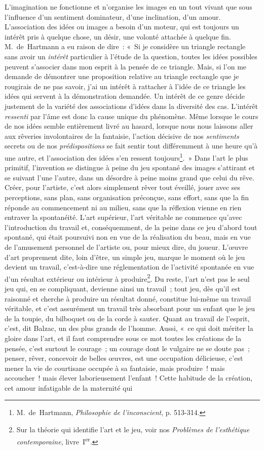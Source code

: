 \documentclass[french,twoside]{book} %
\begin{document}
L’imagination ne fonctionne et n’organise les images en un tout vivant que sous l’influence d’un sentiment dominateur, d’une inclination, d’un amour. L’association des idées ou images a besoin d’un moteur, qui est toujours un intérêt pris à quelque chose, un désir, une volonté attachée à quelque fin. M. de Hartmann a eu raison de dire : « Si je considère un triangle rectangle sans avoir un \emph{intérêt} particulier à l’étude de la question, toutes les idées possibles peuvent s’associer dans mon esprit à la pensée de ce triangle. Mais, si l’on me demande de démontrer une proposition relative au triangle rectangle que je rougirais de ne pas savoir, j’ai un intérêt à rattacher à l’idée de ce triangle les idées qui servent à la démonstration demandée. Un intérêt de ce genre décide justement de la variété des associations d’idées dans la diversité des cas. L’intérêt \emph{ressenti} par l’âme est donc la cause unique du phénomène. Même lorsque le cours de nos idées semble entièrement livré au hasard, lorsque nous nous laissons aller aux rêveries involontaires de la fantaisie, l’action décisive de nos \emph{sentiments} secrets ou de nos \emph{prédispositions} se fait sentir tout différemment à une heure qu’à une autre, et l’association des idées s’en ressent toujours\footnote{ M. de Hartmann, \emph{Philosophie de l’inconscient}, p. 513-314.}. » Dans l’art le plus primitif, l’invention se distingue à peine du jeu spontané des images s’attirant et se suivant l’une l’autre, dans un désordre à peine moins grand que celui du rêve. Créer, pour l’artiste, c’est alors simplement rêver tout éveillé, jouer avec ses perceptions, sans plan, sans organisation préconçue, sans effort, sans que la fin réponde au commencement ni au milieu, sans que la réflexion vienne en rien entraver la spontanéité. L’art supérieur, l’art véritable ne commence qu’avec l’introduction du travail et, conséquemment, de la peine dans ce jeu d’abord tout spontané, qui était poursuivi non en vue de la réalisation du beau, mais en vue de l’amusement personnel de l’artiste ou, pour mieux dire, du joueur. L’œuvre d’art proprement dite, loin d’être, un simple jeu, marque le moment où le jeu devient un travail, c’est-à-dire une réglementation de l’activité spontanée en vue d’un résultat extérieur ou intérieur à produire\footnote{ Sur la théorie qui identifie l’art et le jeu, voir nos \emph{Problèmes de l’esthétique contemporaine}, livre I\textsuperscript{er}.}. Du reste, l’art n’est pas le seul jeu qui, en se compliquant, devienne ainsi un travail ; tout jeu, dès qu’il est raisonné et cherche à produire un résultat donné, constitue lui-même un travail véritable, et c’est assurément un travail très absorbant pour un enfant que le jeu de la toupie, du bilboquet ou de la corde à sauter. Quant au travail de l’esprit, c’est, dit Balzac, un des plus grands de l’homme. Aussi, « ce qui doit mériter la gloire dans l’art, et il faut comprendre sous ce mot toutes les créations de la pensée, c’est surtout le courage ; un courage dont le vulgaire ne se doute pas ; penser, rêver, concevoir de belles œuvres, est une occupation délicieuse, c’est mener la vie de courtisane occupée à sa fantaisie, mais produire ! mais accoucher ! mais élever laborieusement l’enfant ! Cette habitude de la création, cet amour infatigable de la maternité qui 
\end{document}

